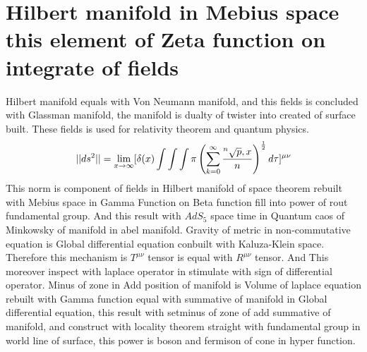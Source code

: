 \documentclass{jsarticle}
\begin{document}
\section{Hilbert manifold in Mebius space \\
        this element of Zeta function on integrate of fields}

 Hilbert manifold equals with Von Neumann manifold, and this fields is concluded with Glassman manifold,
the manifold is dualty of twister into created of surface built.
These fields is used for relativity theorem and quantum physics.
$$ ||ds^2|| = \lim_{x \to \infty} [\delta(x) \int \int \int \pi \left( \sum_{k=0}^{\infty}
		{{}^n\sqrt{p},x \over n} \right)
^{1 \over 2}d \tau]^{\mu\nu} $$
  This norm is component of fields in Hilbert manifold of space theorem rebuilt with
Mebius space in Gamma Function on Beta function fill into power of rout fundamental
group.
And this result with $AdS_5$ space time in Quantum caos of Minkowsky of manifold in
abel manifold.
Gravity of metric in non-commutative equation is Global differential equation
conbuilt with Kaluza-Klein space. Therefore this mechanism is $T^{\mu\nu}$ tensor
is equal with $R^{\mu\nu}$ tensor. And This moreover inspect with laplace operator
in stimulate with sign of differential operator.
Minus of zone in Add position of manifold is Volume of laplace equation rebuilt with
Gamma function equal with summative of manifold in Global differential equation,
this result with setminus of zone of add summative of manifold, and construct with
locality theorem straight with fundamental group in world line of surface, this
power is boson and fermison of cone in hyper function.
\end{document}

